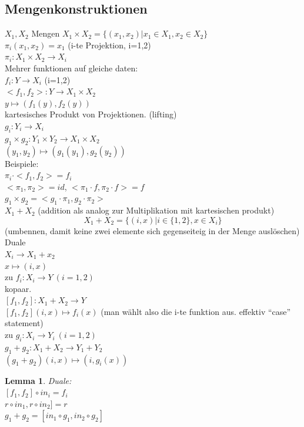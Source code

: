 \documentclass{article}
\newtheorem{lemma}{Lemma}[section]
\theoremstyle{definition}
\begin{document}
	\subsection{Mengenkonstruktionen}
	$X_1,X_2$ Mengen $X_1\times X_2=\{(x_1,x_2)|x_1\in X_1, x_2\in X_2\}$\\
	$\pi_i(x_1,x_2) = x_1$ (i-te Projektion, i=1,2)\\
	$\pi_i : X_1\times X_2 \to X_i$\\
	Mehrer funktionen auf gleiche daten:\\
	$f_i: Y\to X_i$ (i=1,2)\\
	$<f_1,f_2>:Y\to X_1\times X_2$\\
	$y\mapsto (f_1(y),f_2(y))$\\
	kartesisches Produkt von Projektionen. (lifting)\\
	$g_i: Y_i\to X_i$\\
	$g_1\times g_2 :Y_1\times Y_2\to X_1\times X_2$\\
	$(y_1,y_2)\mapsto (g_1(y_1),g_2(y_2))$\\
	Beispiele:\\
	$\pi_i\cdot <f_1,f_2> = f_i$\\
	$<\pi_1,\pi_2> = id$, $<\pi_1\cdot f, \pi_2\cdot f> =f$\\
	$g_1\times g_2 = <g_1\cdot \pi_1, g_2\cdot \pi_2>$\\
	$X_1+X_2$ (addition als analog zur Multiplikation mit kartesischen produkt)\\
	\[X_1+X_2 = \{(i,x)|i\in\{1,2\}, x\in X_i\}\]
	(umbennen, damit keine zwei elemente sich gegenseiteig in der Menge auslöschen)
	Duale\\
	$X_i\to X_1+x_2$\\
	$x\mapsto (i,x)$\\
	zu $f_i:X_i\to Y\ (i=1,2)$\\
	kopaar.\\
	$[f_1,f_2]:X_1+X_2\to Y$\\
	$[f_1,f_2](i,x)\mapsto f_i(x)$ (man wählt also die i-te funktion aus. effektiv ``case'' statement)\\
	zu $g_i:X_i\to Y_i\ (i=1,2)$\\
	$g_1+g_2: X_1+X_2\to Y_1+Y_2$\\
	$(g_1+g_2)(i,x)\mapsto (i,g_i(x))$\\
	\begin{lemma} Duale:\\
	$[f_1,f_2]\circ in_i=f_i$\\
	$r\circ in_1, r\circ in_2] = r$ \\
	$g_1+g_2 = [in_1\circ g_1, in_2\circ g_2]$
	\end{lemma}
\end{document}
